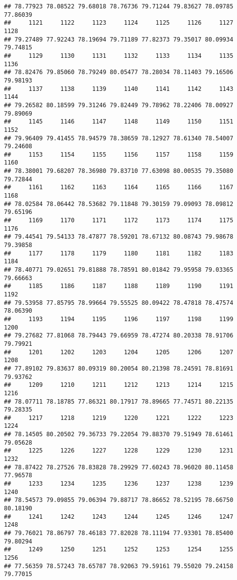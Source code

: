 \documentclass[
]{article}
\begin{document}
\begin{verbatim}
## 78.77923 78.08522 79.68018 78.76736 79.71244 79.83627 78.09785 77.86039 
##     1121     1122     1123     1124     1125     1126     1127     1128 
## 79.27489 77.92243 78.19694 79.71189 77.82373 79.35017 80.09934 79.74815 
##     1129     1130     1131     1132     1133     1134     1135     1136 
## 78.82476 79.85060 78.79249 80.05477 78.28034 78.11403 79.16506 79.98193 
##     1137     1138     1139     1140     1141     1142     1143     1144 
## 79.26582 80.18599 79.31246 79.82449 79.78962 78.22406 78.00927 79.89069 
##     1145     1146     1147     1148     1149     1150     1151     1152 
## 79.96409 79.41455 78.94579 78.38659 78.12927 78.61340 78.54007 79.24608 
##     1153     1154     1155     1156     1157     1158     1159     1160 
## 78.38001 79.68207 78.36980 79.83710 77.63098 80.00535 79.35080 79.72844 
##     1161     1162     1163     1164     1165     1166     1167     1168 
## 78.02584 78.06442 78.53682 79.11848 79.30159 79.09093 78.09812 79.65196 
##     1169     1170     1171     1172     1173     1174     1175     1176 
## 79.44541 79.54133 78.47877 78.59201 78.67132 80.08743 79.98678 79.39858 
##     1177     1178     1179     1180     1181     1182     1183     1184 
## 78.40771 79.02651 79.81888 78.78591 80.01842 79.95958 79.03365 79.66663 
##     1185     1186     1187     1188     1189     1190     1191     1192 
## 79.53958 77.85795 78.99664 79.55525 80.09422 78.47818 78.47574 78.06390 
##     1193     1194     1195     1196     1197     1198     1199     1200 
## 79.27682 77.81068 78.79443 79.66959 78.47274 80.20338 78.91706 79.79921 
##     1201     1202     1203     1204     1205     1206     1207     1208 
## 77.89102 79.83637 80.09319 80.20054 80.21398 78.24591 78.81691 79.93762 
##     1209     1210     1211     1212     1213     1214     1215     1216 
## 78.07711 78.18785 77.86321 80.17917 78.89665 77.74571 80.22135 79.28335 
##     1217     1218     1219     1220     1221     1222     1223     1224 
## 78.14505 80.20502 79.36733 79.22054 79.88370 79.51949 78.61461 79.05628 
##     1225     1226     1227     1228     1229     1230     1231     1232 
## 78.87422 78.27526 78.83828 78.29929 77.60243 78.96020 80.11458 77.96578 
##     1233     1234     1235     1236     1237     1238     1239     1240 
## 78.54573 79.09855 79.06394 79.88717 78.86652 78.52195 78.66750 80.18190 
##     1241     1242     1243     1244     1245     1246     1247     1248 
## 79.76021 78.86797 78.46183 77.82028 78.11194 77.93301 78.85400 79.80294 
##     1249     1250     1251     1252     1253     1254     1255     1256 
## 77.56359 78.57243 78.65787 78.92063 79.59161 79.55020 79.24158 79.77015 

\end{verbatim}
\end{document}
